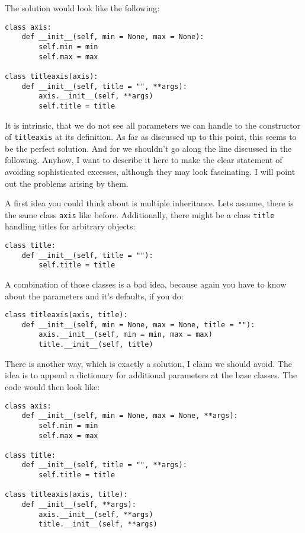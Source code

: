 \documentclass{article}
\begin{document}
The solution would look like the following:
\begin{verbatim}
class axis:
    def __init__(self, min = None, max = None):
        self.min = min
        self.max = max

class titleaxis(axis):
    def __init__(self, title = "", **args):
        axis.__init__(self, **args)
        self.title = title
\end{verbatim}

It is intrinsic, that we do not see all parameters we can handle to
the constructor of \verb|titleaxis| at its definition. As far as
discussed up to this point, this seems to be the perfect solution. And
for \PyX we shouldn't go along the line discussed in the following.
Anyhow, I want to describe it here to make the clear statement of
avoiding sophisticated excesses, although they may look fascinating.
I will point out the problems arising by them.

A first idea you could think about is multiple inheritance. Lets
assume, there is the same class \verb|axis| like before. Additionally,
there might be a class \verb|title| handling titles for arbitrary
objects:
\begin{verbatim}
class title:
    def __init__(self, title = ""):
        self.title = title
\end{verbatim}

A combination of those classes is a bad idea, because again you have
to know about the parameters and it's defaults, if you do:
\begin{verbatim}
class titleaxis(axis, title):
    def __init__(self, min = None, max = None, title = ""):
        axis.__init__(self, min = min, max = max)
        title.__init__(self, title)
\end{verbatim}

There is another way, which is exactly a solution, I claim we should
avoid. The idea is to append a dictionary for additional parameters at
the base classes. The code would then look like:

\begin{verbatim}
class axis:
    def __init__(self, min = None, max = None, **args):
        self.min = min
        self.max = max

class title:
    def __init__(self, title = "", **args):
        self.title = title

class titleaxis(axis, title):
    def __init__(self, **args):
        axis.__init__(self, **args)
        title.__init__(self, **args)
\end{verbatim}
\end{document}
